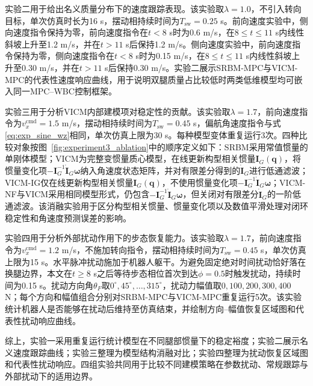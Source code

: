 ﻿\documentclass[preprint,12pt]{elsarticle}
\begin{document}
实验二用于给出名义质量分布下的速度跟踪表现。该实验取$\lambda=1.0$，不引入转向目标，单次仿真时长为16 s，摆动相持续时间为$T_{\mathrm{sw}}=0.25$ s。前向速度实验中，侧向速度指令保持为零，前向速度指令在$t<8$ s时为0.6 m/s，在$8\le t\le11$ s内线性斜坡上升至1.2 m/s，并在$t>11$ s后保持1.2 m/s。侧向速度实验中，前向速度指令保持为零，侧向速度指令在$t<8$ s时为0.15 m/s，在$8\le t\le11$ s内线性斜坡上升至0.30 m/s，并在$t>11$ s后保持0.30 m/s。实验二展示SRBM-MPC与VICM-MPC的代表性速度响应曲线，用于说明双腿质量占比较低时两类低维模型均可嵌入同一MPC--WBC控制框架。

实验三用于分析VICM内部建模项对稳定性的贡献。该实验取$\lambda=1.7$，前向速度指令为$v_x^{\mathrm{cmd}}=1.5$ m/s，摆动相持续时间为$T_{\mathrm{sw}}=0.45$ s，偏航角速度指令与式\eqref{eq:exp_sine_wz}相同，单次仿真上限为30 s。每种模型变体重复运行3次。四种比较对象按图~\ref{fig:experiment3_ablation}中的顺序定义如下：SRBM采用常值惯量的单刚体模型；VICM为完整变惯量质心模型，在线更新构型相关惯量$\bm I_G(\bm q)$，将惯量变化项$-\bm I_G^{-1}\dot{\bm I}_G\bm\omega$纳入角速度状态矩阵，并对有限差分得到的$\dot{\bm I}_G$进行低通滤波；VICM-IG仅在线更新构型相关惯量$\bm I_G(\bm q)$，不使用惯量变化项$-\bm I_G^{-1}\dot{\bm I}_G\bm\omega$；VICM-NF与VICM采用相同模型形式，仍包含$-\bm I_G^{-1}\dot{\bm I}_G\bm\omega$，但关闭对有限差分$\dot{\bm I}_G$的一阶低通滤波。该消融实验用于区分构型相关惯量、惯量变化项以及数值平滑处理对闭环稳定性和角速度预测误差的影响。

实验四用于分析外部扰动作用下的步态恢复能力。该实验取$\lambda=1.7$，前向速度指令为$v_x^{\mathrm{cmd}}=1.2$ m/s，不施加转向指令，摆动相持续时间为$T_{\mathrm{sw}}=0.45$ s，单次仿真上限为15 s。水平脉冲扰动施加于机器人躯干。为避免固定绝对时间扰动恰好落在换腿边界，本文在$t\ge8$ s之后等待步态相位首次到达$\phi=0.5$时触发扰动，持续时间为0.15 s。扰动方向角$\theta_F$取$0^\circ,45^\circ,\ldots,315^\circ$，扰动力幅值取$0,100,200,300,400$ N；每个方向和幅值组合分别对SRBM-MPC与VICM-MPC重复运行5次。该实验统计机器人是否能够在扰动后维持至仿真结束，并绘制方向--幅值恢复区域图和代表性扰动响应曲线。

综上，实验一采用重复运行统计模型在不同腿部惯量下的稳定裕度；实验二展示名义速度跟踪曲线；实验三整理为模型结构消融对比；实验四整理为扰动恢复区域图和代表性扰动响应。四组实验共同用于比较不同建模策略在参数扰动、常规跟踪与外部扰动下的适用边界。
\end{document}

